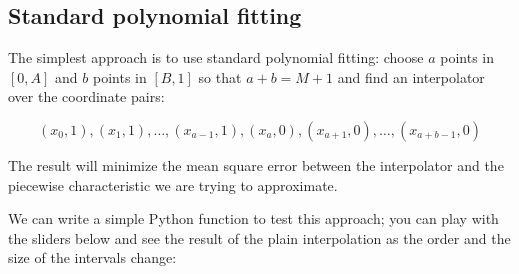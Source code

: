 \documentclass[11pt]{article}
\begin{document}
    \subsection{Standard polynomial
fitting}\label{standard-polynomial-fitting}

The simplest approach is to use standard polynomial fitting: choose
\(a\) points in \([0, A]\) and \(b\) points in \([B, 1]\) so that
\(a+b = M+1\) and find an interpolator over the coordinate pairs:

\[
  (x_0, 1), (x_1, 1), \ldots, (x_{a-1}, 1), (x_a, 0), (x_{a+1}, 0), \ldots, (x_{a+b-1}, 0)
\]

The result will minimize the mean square error between the interpolator
and the piecewise characteristic we are trying to approximate.

We can write a simple Python function to test this approach; you can
play with the sliders below and see the result of the plain
interpolation as the order and the size of the intervals change:
\end{document}
